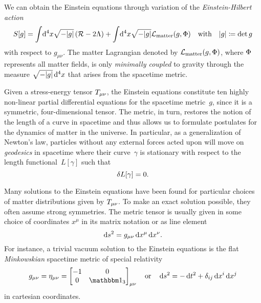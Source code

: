 We can obtain the Einstein equations through variation of the \emph{Einstein-Hilbert action}
\begin{align}\label{eq:einstein_hilbert_action}%
	S[g] = \int \! \dif{^4x} \sqrt{-\metrdet{g}} \del{\Rscal - 2\cosmconst} + \int \! \dif{^4x} \sqrt{-\metrdet{g}} \lagrdensmatter \quad \text{with} \quad \metrdet{g} \defeq \det{g}
\end{align}
with respect to \(g_{\mu \nu}\). The matter Lagrangian denoted by \(\mathcal{L}_\textnormal{matter}(g,\Phi)\), where \(\Phi\) represents all matter fields, is only \emph{minimally coupled} to gravity through the measure \(\sqrt{-\metrdet{g}}\dif{^4x}\) that arises from the spacetime metric.

Given a stress-energy tensor \(T_{\mu \nu}\), the Einstein equations constitute ten highly non-linear partial differential equations for the spacetime metric~\(g\), since it is a symmetric, four-dimensional tensor. The metric, in turn, restores the notion of the length of a curve in spacetime and thus allows us to formulate postulates for the dynamics of matter in the universe. In particular, as a generalization of Newton's law, particles without any external forces acted upon will move on \emph{geodesics} in spacetime where their curve~\(\gamma\) is stationary with respect to the length functional~\(L[\gamma]\) such that
\begin{equation}
	\delta L[\gamma] = 0
	\mathpunct{.}
\end{equation}

Many solutions to the Einstein equations have been found for particular choices of matter distributions given by \(T_{\mu\nu}\). To make an exact solution possible, they often assume strong symmetries. The metric tensor is usually given in some choice of coordinates \(x^\mu\) in its matrix notation or as line element
\begin{equation}
	\dif{s}^2 = g_{\mu \nu}\dif{x}^\mu \dif{x}^\nu
	\eqpunct{.}
\end{equation}
For instance, a trivial vacuum solution to the Einstein equations is the flat \emph{Minkowskian} spacetime metric of special relativity
\begin{equation}
	g_{\mu \nu} = \eta_{\mu \nu} =
	\begin{bmatrix}
		-1 & 0 \\
		0 & \idmat_3
	\end{bmatrix}_{\mu \nu} \quad \text{or} \quad \dif{s}^2 = -\dif{t}^2 + \delta_{ij} \dif{x}^i \dif{x}^j
\end{equation}
in cartesian coordinates. 


